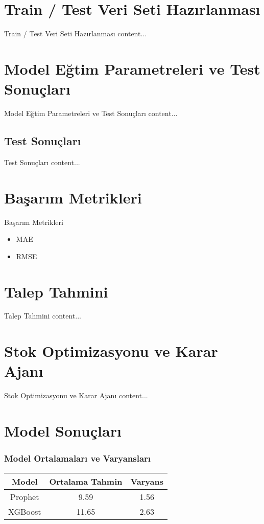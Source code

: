 \documentclass[12pt]{beamer}
\begin{document}
\section{Train / Test Veri Seti Hazırlanması}
\begin{frame}{Train / Test Veri Seti Hazırlanması}
	content...
\end{frame}

\section{Model Eğtim Parametreleri ve Test Sonuçları}
\begin{frame}{Model Eğtim Parametreleri ve Test Sonuçları}
	content...
\end{frame}

\subsection{Test Sonuçları}
\begin{frame}{Test Sonuçları}
	content...
\end{frame}

\section{Başarım Metrikleri}
\begin{frame}{Başarım Metrikleri}
	\begin{itemize}
		\item MAE
		\item RMSE
	\end{itemize}
\end{frame}

\section{Talep Tahmini}
\begin{frame}{Talep Tahmini}
	content...
\end{frame}


\section{Stok Optimizasyonu ve Karar Ajanı}
\begin{frame}{Stok Optimizasyonu ve Karar Ajanı}
	content...
\end{frame}

\section{Model Sonuçları}
\begin{frame}
  \frametitle{Model Ortalamaları ve Varyansları}
  \begin{tabular}{c|c|c}
    \textbf{Model} & \textbf{Ortalama Tahmin} & \textbf{Varyans} \\ \hline
    Prophet        & 9.59                     & 1.56 \\
    XGBoost        & 11.65                    & 2.63 \\
  \end{tabular}
\end{frame}
\end{document}
